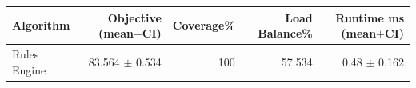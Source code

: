 \begin{tabular}{lrrrr}
\hline
Algorithm & Objective (mean$\pm$CI) & Coverage\% & Load Balance\% & Runtime ms (mean$\pm$CI)\\
\hline
Rules Engine & 83.564 $\pm$ 0.534 & 100 & 57.534 & 0.48 $\pm$ 0.162\\
\hline
\end{tabular}
